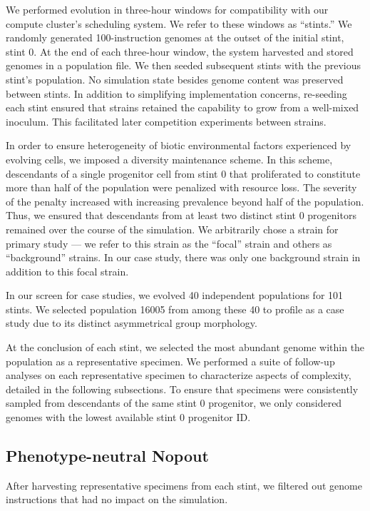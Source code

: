 We performed evolution in three-hour windows for compatibility with our compute cluster's scheduling system.
We refer to these windows as ``stints.''
We randomly generated 100-instruction genomes at the outset of the initial stint, stint 0.
At the end of each three-hour window, the system harvested and stored genomes in a population file.
We then seeded subsequent stints with the previous stint's population.
No simulation state besides genome content was preserved between stints.
In addition to simplifying implementation concerns, re-seeding each stint ensured that strains retained the capability to grow from a well-mixed inoculum.
This facilitated later competition experiments between strains.

In order to ensure heterogeneity of biotic environmental factors experienced by evolving cells, we imposed a diversity maintenance scheme.
In this scheme, descendants of a single progenitor cell from stint 0 that proliferated to constitute more than half of the population were penalized with resource loss.
The severity of the penalty increased with increasing prevalence beyond half of the population.
Thus, we ensured that descendants from at least two distinct stint 0 progenitors remained over the course of the simulation.
We arbitrarily chose a strain for primary study --- we refer to this strain as the ``focal'' strain and others as ``background'' strains.
In our case study, there was only one background strain in addition to this focal strain.

In our screen for case studies, we evolved 40 independent populations for 101 stints.
We selected population 16005 from among these 40 to profile as a case study due to its distinct asymmetrical group morphology.

At the conclusion of each stint, we selected the most abundant genome within the population as a representative specimen.
We performed a suite of follow-up analyses on each representative specimen to characterize aspects of complexity, detailed in the following subsections.
To ensure that specimens were consistently sampled from descendants of the same stint 0 progenitor, we only considered genomes with the lowest available stint 0 progenitor ID.

\subsection{Phenotype-neutral Nopout}
\label{sec:phenotype_neutral_nopout}

After harvesting representative specimens from each stint, we filtered out genome instructions that had no impact on the simulation.


